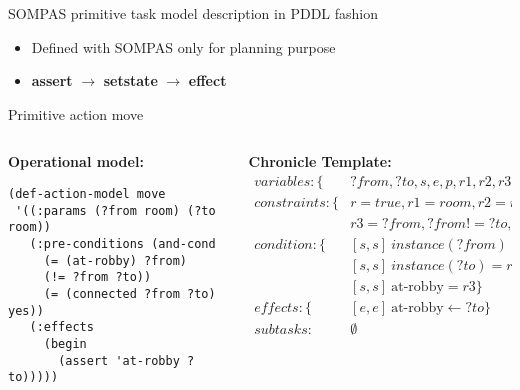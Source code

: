 \begin{frame}[fragile]{SOMPAS primitive task model description in PDDL fashion}
    \small
    \begin{itemize}
        \item Defined with SOMPAS only for planning purpose
        \pause
        \item \textbf{assert} $\rightarrow$ \textbf{setstate} $\rightarrow$ \textbf{effect} 
    \end{itemize}
    Primitive action move
    \begin{columns}[T] %
        \begin{column}{.48\textwidth}
            \small
            \textbf{Operational model:}
            \tiny
            \begin{lstlisting}
(def-action-model move
 '((:params (?from room) (?to room))
   (:pre-conditions (and-cond 
     (= (at-robby) ?from)
     (!= ?from ?to))
     (= (connected ?from ?to) yes))
   (:effects
     (begin
       (assert 'at-robby ?to)))))
            \end{lstlisting}
        \end{column}%
        \begin{column}{.48\textwidth}
            \small
            \textbf{Chronicle Template:}
            \tiny
            \begin{align*}
            variables: \{&?from, ?to, s, e, p, r1,r2,r3,r\}\\
            constraints: \{&r = true, r1 = room, r2 = room\\
                & r3 = ?from, ?from != ?to, s < e \}\\
            condition:\{&[s,s]\ instance(?from) = r1 \\
                &[s,s]\ instance(?to) = r2\\
                &[s,s]\ \text{at-robby} = r3 \}\\
            effects:\{&[e,e]\ \text{at-robby} \leftarrow ?to\} \\
            subtasks:& \emptyset
            \end{align*}
        \end{column}
    \end{columns}   
    
\end{frame}



